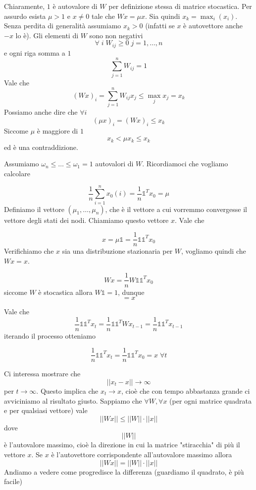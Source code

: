 \documentclass[12pt]{report}
\begin{document}
\begin{dimo}
    Chiaramente, $1$ è autovalore di $W$ per definizione stessa di matrice stocastica. Per assurdo esista $\mu > 1$ e $x \neq 0$ tale che $Wx = \mu x$. Sia quindi $x_k = \max_i (x_i)$. Senza perdita di generalità assumiamo $x_k > 0$ (infatti se $x$ è autovettore anche $-x$ lo è). Gli elementi di $W$ sono non negativi
    $$\forall \; i\; W_{ij}  \geq 0 \; j = 1,\dots,n$$
    e ogni riga somma a $1$
    $$\sum_{j=1}^n W_{ij} = 1$$
    Vale che
    $$(Wx)_i = \sum_{j=1}^n W_{ij}x_j \leq \max_j x_j = x_k$$
    Possiamo anche dire che $\forall i$
    $$(\mu x)_i = (Wx)_i \leq x_k$$
    Siccome $\mu$ è maggiore di $1$ 
    $$x_k < \mu x_k \leq x_k$$
    ed è una contraddizione.
\end{dimo}  

\vspace{10px}
Assumiamo $\omega_n \leq \dots \leq \omega_1 = 1$ autovalori di $W$. Ricordiamoci che vogliamo calcolare

$$\frac{1}{n} \sum_{i=1}^n x_0(i) = \frac{1}{n}\mathds{1}^T x_0 = \mu$$
Definiamo il vettore $(\mu_1,\dots,\mu_n)$, che è il vettore a cui vorremmo convergesse il vettore degli stati dei nodi. Chiamiamo questo vettore $x$. Vale che

$$x = \mu \mathds{1} = \frac{1}{n}\mathds{1}\mathds{1}^T x_0$$
Verifichiamo che $x$ sia una distribuzione stazionaria per $W$, vogliamo quindi che $Wx = x$.

$$Wx = \frac{1}{n} W \mathds{1} \mathds{1}^T x_0$$
siccome $W$ è stocastica allora $W \mathds{1} = 1$, dunque
$$= x$$

\begin{fatto}
    Vale che
    $$\frac{1}{n} \mathds{1} \mathds{1}^T x_t = \frac{1}{n} \mathds{1} \mathds{1}^T W x_{t-1} = \frac{1}{n} \mathds{1} \mathds{1}^T x_{t-1}$$
    iterando il processo otteniamo 

    $$\frac{1}{n} \mathds{1} \mathds{1}^T x_t = \frac{1}{n} \mathds{1} \mathds{1}^T x_0 = x \; \forall t$$
\end{fatto}

\noindent
Ci interessa mostrare che 
$$||x_t - x || \rightarrow \infty$$ 
per $t \rightarrow \infty$. Questo implica che $x_t \rightarrow x$, cioè che con tempo abbastanza grande ci avviciniamo al risultato giusto. Sappiamo che $\forall W, \forall x$ (per ogni matrice quadrata e per qualsiasi vettore) vale 
$$|| W x || \leq ||W||\cdot||x||$$
dove $$||W||$$ è l'autovalore massimo, cioè la direzione in cui la matrice "stiracchia" di più il vettore $x$. Se $x$ è l'autovettore corrispondente all'autovalore massimo allora
$$|| W x || = ||W||\cdot||x||$$
Andiamo a vedere come progredisce la differenza (guardiamo il quadrato, è più facile)
\end{document}
